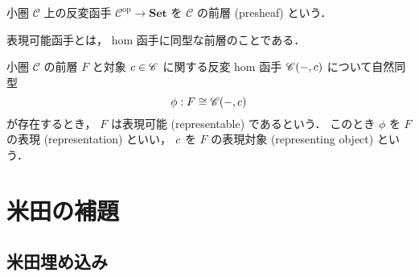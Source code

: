 \documentclass[titlepage]{ltjsreport}
\newcommand{\cat}[1]{\mathscr{#1}}
\newcommand{\obj}[1]{\lowercase{#1}}
\newcommand{\objs}[1]{#1}
\newcommand{\mrps}[3]{#1(#2,#3)}
\newcommand{\op}[1]{{#1}^{\mathrm{op}}}
\newcommand{\set}{\mathbf{Set}}
\begin{document}
\begin{definition}[前層]
  \def\C{\cat{C}}%
  小圏 $\C$ 上の反変函手 $\op{\C}\to\set$ を
  $\C$ の前層 (presheaf) という．
\end{definition}

表現可能函手とは，
hom 函手に同型な前層のことである．

\begin{definition}[表現可能函手]
  \def\C{\cat{C}}%
  \def\c{\obj{c}}%
  \def\F{F}%
  \def\iso{\phi}%
  小圏 $\C$ の前層 $\F$ と対象 $\c\in\objs{\C}$
  に関する反変 hom 函手 $\mrps{\C}{-}{\c}$ について自然同型
  \begin{equation}
    \iso:\F\cong\mrps{\C}{-}{\c}
  \end{equation}
  が存在するとき，
  $\F$ は表現可能 (representable) であるという．
  このとき $\iso$ を $\F$ の表現 (representation) といい，
  $\c$ を $\F$ の表現対象 (representing object) という．
\end{definition}

\section{米田の補題}

\subsection{米田埋め込み}
\end{document}
